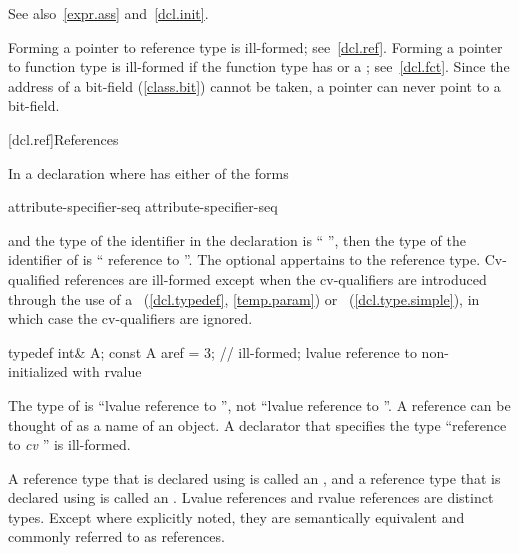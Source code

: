 \pnum
See also~\ref{expr.ass} and~\ref{dcl.init}.

\pnum
\enternote
Forming a pointer to reference type is ill-formed; see~\ref{dcl.ref}.
Forming a pointer to function type is ill-formed if the function type has
 or a ;
see~\ref{dcl.fct}.
Since the address of a bit-field (\ref{class.bit}) cannot be taken,
a pointer can never point to a bit-field.
\exitnote

[dcl.ref]{References}%

\pnum
In a declaration
where
has either of the forms

\begin{ncsimplebnf}
\terminal{\&} attribute-specifier-seq\opt {}\br
\terminal{\&\&} attribute-specifier-seq\opt {}
\end{ncsimplebnf}

and the type of the identifier in the declaration
is ``
'',
then the type of the identifier of
is `` reference to
''.
The optional  appertains to the reference type.
Cv-qualified references are ill-formed except when the cv-qualifiers
are introduced through the use of a
~(\ref{dcl.typedef}, \ref{temp.param}) or
~(\ref{dcl.type.simple}),
in which case the cv-qualifiers are ignored.
\enterexample

\begin{codeblock}
typedef int& A;
const A aref = 3;   // ill-formed; lvalue reference to non- initialized with rvalue
\end{codeblock}

The type of
is ``lvalue reference to '',
not ``lvalue reference to ''.
\exitexample
{}%
\enternote
A reference can be thought of as a name of an object.
\exitnote
A declarator that specifies the type
``reference to \textit{cv} ''
is ill-formed.


\pnum
{}%
%
A reference type that is declared using \tcode{\&} is called an
, and a reference type that
is declared using \tcode{\&\&} is called an
. Lvalue references and
rvalue references are distinct types. Except where explicitly noted, they are
semantically equivalent and commonly referred to as references.

